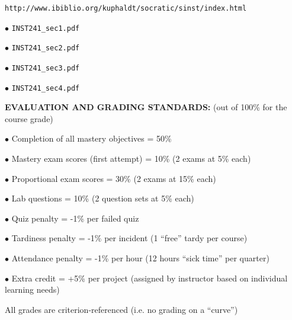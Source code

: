 \noindent
{\tt http://www.ibiblio.org/kuphaldt/socratic/sinst/index.html} 

\vskip 5pt

\item{$\bullet$} {\tt INST241\_sec1.pdf} 
\item{$\bullet$} {\tt INST241\_sec2.pdf} 
\item{$\bullet$} {\tt INST241\_sec3.pdf} 
\item{$\bullet$} {\tt INST241\_sec4.pdf} 


\vfil \eject

\noindent
{\bf EVALUATION AND GRADING STANDARDS:} (out of 100\% for the course grade)

\item{$\bullet$} Completion of all mastery objectives = 50\% 
\item{$\bullet$} Mastery exam scores (first attempt) = 10\% (2 exams at 5\% each)
\item{$\bullet$} Proportional exam scores = 30\% (2 exams at 15\% each)
\item{$\bullet$} Lab questions = 10\% (2 question sets at 5\% each)
\item{$\bullet$} Quiz penalty = -1\% per failed quiz
\item{$\bullet$} Tardiness penalty = -1\% per incident (1 ``free'' tardy per course)
\item{$\bullet$} Attendance penalty = -1\% per hour (12 hours ``sick time'' per quarter)
\item{$\bullet$} Extra credit = +5\% per project (assigned by instructor based on individual learning needs)

\vskip 10pt

\noindent
All grades are criterion-referenced (i.e. no grading on a ``curve'')

